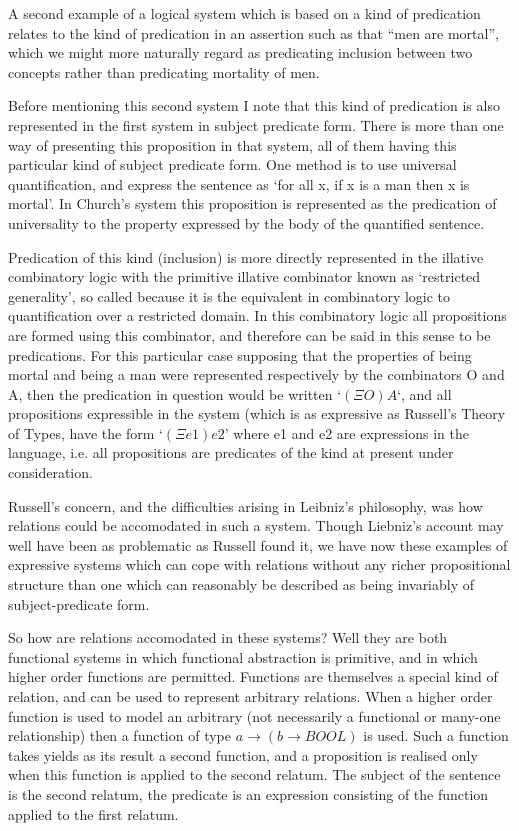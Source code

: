 \documentclass{rbjk}
\begin{document}
\begin{article}
A second example of a logical system which is based on a kind of predication relates to the kind of predication in an assertion such as that ``men are mortal'', which we might more naturally regard as predicating inclusion between two concepts rather than predicating mortality of men.

Before mentioning this second system I note that this kind of predication is also represented in the first system in subject predicate form.
There is more than one way of presenting this proposition in that system, all of them having this particular kind of subject predicate form.
One method is to use universal quantification, and express the sentence as `for all x, if x is a man then x is mortal'.
In Church's system this proposition is represented as the predication of universality to the property expressed by the body of the quantified sentence.

Predication of this kind (inclusion) is more directly represented in the illative combinatory logic with the primitive illative combinator known as `restricted generality', so called because it is the equivalent in combinatory logic to quantification over a restricted domain.
In this combinatory logic all propositions are formed using this combinator, and therefore can be said in this sense to be predications.
For this particular case supposing that the properties of being mortal and being a man were represented respectively by the combinators O and A, then the predication in question would be written `$(\Xi O) A$`, and all propositions expressible in the system (which is as expressive as Russell's Theory of Types, have the form `$({\Xi} e1) e2$' where e1 and e2 are expressions in the language, i.e. all propositions are predicates of the kind at present under consideration.

Russell's concern, and the difficulties arising in Leibniz's philosophy, was how relations could be accomodated in such a system.
Though Liebniz's account may well have been as problematic as Russell found it, we have now these examples of expressive systems which can cope with relations without any richer propositional structure than one which can reasonably be described as being invariably of subject-predicate form.

So how are relations accomodated in these systems?
Well they are both functional systems in which functional abstraction is primitive, and in which higher order functions are permitted.
Functions are themselves a special kind of relation, and can be used to represent arbitrary relations.
When a higher order function is used to model an arbitrary (not necessarily a functional or many-one relationship) then a function of type $a \rightarrow (b \rightarrow BOOL)$ is used.
Such a function takes yields as its result a second function, and a proposition is realised only when this function is applied to the second relatum.
The subject of the sentence is the second relatum, the predicate is an expression consisting of the function applied to the first relatum.


\end{article}
\end{document}
